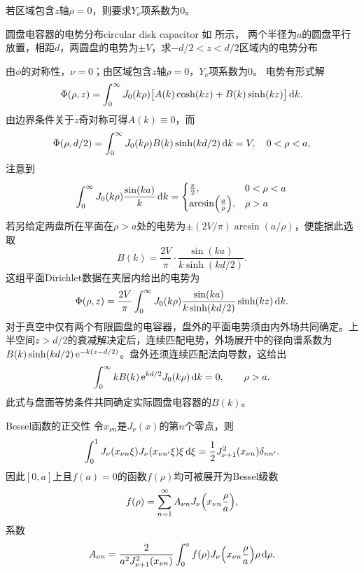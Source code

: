 若区域包含$z$轴$\rho = 0$，则要求$Y_\nu$项系数为0。

\begin{example}
    {圆盘电容器的电势分布}{circular disk capacitor}
    如 所示，
    两个半径为$a$的圆盘平行放置，相距$d$，两圆盘的电势为$\pm V$，求$-d/2 < z < d/2$区域内的电势分布
    \begin{notecaptionblock}
        \label{fig:circular disk capacitor}
    \end{notecaptionblock}
    由$\phi$的对称性，$\nu = 0$；由区域包含$z$轴$\rho = 0$，$Y_\nu$项系数为0。
    电势有形式解
    \[
        \Phi(\rho,z) = \int_0^\infty J_0(k\rho)\bigl[A(k)\cosh(kz) + B(k)\sinh(kz)\bigr]\mathop{}\!\mathrm{d} k.
    \]
    由边界条件关于$z$奇对称可得$A(k) \equiv 0$，而
    \[
        \Phi(\rho,d/2) = \int_0^\infty J_0(k\rho)B(k)\sinh(kd/2)\mathop{}\!\mathrm{d} k = V,\quad 0 < \rho < a,
    \]
    注意到
    \begin{equation}
        \label{eq:ed-disk-bessel-integral}
        \int_0^\infty J_0(k\rho)\frac{\sin(ka)}k\mathop{}\!\mathrm{d} k = \begin{cases}
            \frac\pi2,&0 < \rho < a\\
            \arcsin\Bigl(\frac a\rho\Bigr),&\rho > a
        \end{cases}
    \end{equation}
    若另给定两盘所在平面在$\rho > a$处的电势为$\pm(2V/\pi)\arcsin(a/\rho)$，便能据此选取
    \[
        B(k) = \frac{2V}{\pi} \cdot \frac{\sin(ka)}{k\sinh(kd/2)}.
    \]
    这组平面Dirichlet数据在夹层内给出的电势为
    \[
        \Phi(\rho,z) = \frac{2V}{\pi}\int_0^\infty J_0(k\rho)\frac{\sin(ka)}{k\sinh(kd/2)}\sinh(kz)\mathop{}\!\mathrm{d} k.
    \]
    对于真空中仅有两个有限圆盘的电容器，盘外的平面电势须由内外场共同确定。上半空间$z > d/2$的衰减解决定后，连续匹配电势，外场展开中的径向谱系数为$B(k)\sinh(kd/2)\mathop{}\!\mathrm{e}^{-k(z-d/2)}$。盘外还须连续匹配法向导数，这给出
    \[
        \int_0^\infty kB(k)\mathop{}\!\mathrm{e}^{kd/2}J_0(k\rho)\mathop{}\!\mathrm{d} k = 0,\qquad \rho > a .
    \]
    此式与盘面等势条件共同确定实际圆盘电容器的$B(k)$。
\end{example}

\begin{theorem}{Bessel函数的正交性}{}
    令$x_{\nu n}$是$J_\nu(x)$的第$n$个零点，则
    \begin{equation}
        \int_0^1 J_\nu(x_{\nu n}\xi)J_\nu(x_{\nu n'}\xi)\xi\mathop{}\!\mathrm{d}\xi = \frac12J_{\nu+1}^2(x_{\nu n})\delta_{nn'}.
    \end{equation}
    因此$[0,a]$上且$f(a) = 0$的函数$f(\rho)$均可被展开为Bessel级数
    \begin{equation}
        \label{eq:ed-fourier-bessel-series}
        f(\rho) = \sum_{n=1}^\infty A_{\nu n}J_\nu\Bigl(x_{\nu n}\frac\rho a\Bigr),
    \end{equation}
    系数 
    \begin{equation}
        \label{eq:ed-fourier-bessel-coefficients}
        A_{\nu n} = \frac2{a^2J_{\nu+1}^2(x_{\nu n})}\int_0^af(\rho)J_\nu\Bigl(x_{\nu n}\frac\rho a\Bigr)\rho\mathop{}\!\mathrm{d}\rho.
    \end{equation}
\end{theorem}

